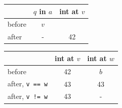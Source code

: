\begin{kyHoareWatch}
\begin{tabular}{l|cc}
 & $q$ in $a$ & int at $v$ \\
\hline
before & $v$ & \\
after & - & 42 \\
\end{tabular}
\end{kyHoareWatch}
\begin{kyHoareWatch}
\begin{tabular}{l|cc}
 & int at $v$ & int at $w$ \\
\hline
before & 42 & $b$ \\
after, \verb|v == w| & 43 & 43 \\
after, \verb|v != w| & 43 & - \\
\end{tabular}
\end{kyHoareWatch}
